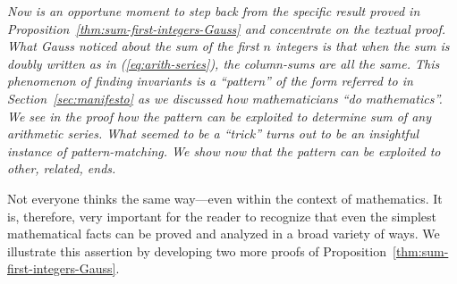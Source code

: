 %
{\em Now is an opportune moment to step back from the specific result
  proved in Proposition~\ref{thm:sum-first-integers-Gauss} and
  concentrate on the textual proof.  What Gauss noticed about the sum
  of the first $n$ integers is that when the sum is doubly written as
  in (\ref{eq:arith-series}), the column-sums are all the same.  This
  phenomenon of {\em finding invariants} is a ``pattern'' of the form
  referred to in Section~\ref{sec:manifesto} as we discussed how
  mathematicians ``do mathematics''.  We see in the proof how the
  pattern can be exploited to determine sum of any arithmetic series.
  {\em What seemed to be a ``trick'' turns out to be an insightful
    instance of pattern-matching.}  We show now that the pattern can
  be exploited to other, related, ends.}

\medskip

Not everyone thinks the same way---even within the context of
mathematics.  It is, therefore, very important for the reader to
recognize that even the simplest mathematical facts can be proved and
analyzed in a broad variety of ways.  We illustrate this assertion by
developing two more proofs of
Proposition~\ref{thm:sum-first-integers-Gauss}.

